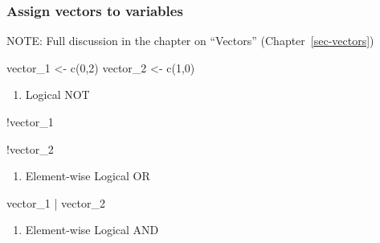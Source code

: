 \documentclass[
  letterpaper,
  DIV=11,
  numbers=noendperiod]{scrreprt}
\newenvironment{Shaded}{}{}
\newcommand{\DecValTok}[1]{\textcolor[rgb]{0.00,0.36,0.77}{#1}}
\newcommand{\FunctionTok}[1]{\textcolor[rgb]{0.44,0.26,0.76}{#1}}
\newcommand{\NormalTok}[1]{\textcolor[rgb]{0.14,0.16,0.18}{#1}}
\newcommand{\OtherTok}[1]{\textcolor[rgb]{0.44,0.26,0.76}{#1}}
\newcommand{\SpecialCharTok}[1]{\textcolor[rgb]{0.00,0.36,0.77}{#1}}
\providecommand{\tightlist}{%
  \setlength{\itemsep}{0pt}\setlength{\parskip}{0pt}}\usepackage{longtable,booktabs,array}
\begin{document}
\subsubsection{Assign vectors to
variables}\label{assign-vectors-to-variables}

NOTE: Full discussion in the chapter on ``Vectors''
(Chapter~\ref{sec-vectors})

\begin{Shaded}
\begin{Highlighting}[]
\NormalTok{vector\_1 }\OtherTok{\textless{}{-}} \FunctionTok{c}\NormalTok{(}\DecValTok{0}\NormalTok{,}\DecValTok{2}\NormalTok{)}
\NormalTok{vector\_2 }\OtherTok{\textless{}{-}} \FunctionTok{c}\NormalTok{(}\DecValTok{1}\NormalTok{,}\DecValTok{0}\NormalTok{)}
\end{Highlighting}
\end{Shaded}

\begin{enumerate}
\def\labelenumi{\alph{enumi}.}
\tightlist
\item
  Logical NOT
\end{enumerate}

\begin{Shaded}
\begin{Highlighting}[]
\SpecialCharTok{!}\NormalTok{vector\_1}
\end{Highlighting}
\end{Shaded}

\begin{Shaded}
\begin{Highlighting}[]
\SpecialCharTok{!}\NormalTok{vector\_2}
\end{Highlighting}
\end{Shaded}

\begin{enumerate}
\def\labelenumi{\alph{enumi}.}
\setcounter{enumi}{1}
\tightlist
\item
  Element-wise Logical OR
\end{enumerate}

\begin{Shaded}
\begin{Highlighting}[]
\NormalTok{vector\_1 }\SpecialCharTok{|}\NormalTok{ vector\_2}
\end{Highlighting}
\end{Shaded}

\begin{enumerate}
\def\labelenumi{\alph{enumi}.}
\setcounter{enumi}{2}
\tightlist
\item
  Element-wise Logical AND
\end{enumerate}
\end{document}
